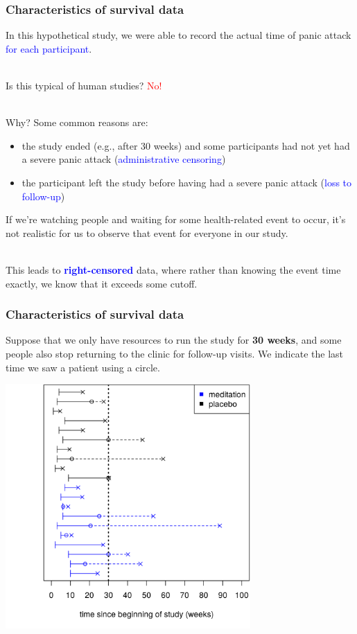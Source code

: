 \documentclass[10pt,t]{beamer}
\begin{document}
\begin{frame}
\frametitle{Characteristics of survival data}

\vspace{-5 mm}

In this hypothetical study, we were able to record the actual time of panic attack \textcolor{blue}{for each participant}.
\\ ~\ 

Is this typical of human studies?   \textcolor{red}{No!}
\\ ~\ 

Why?   Some common reasons are:
\medskip

\begin{itemize}
\item the study ended (e.g., after 30 weeks) and some participants had not yet had a severe panic attack (\textcolor{blue}{administrative censoring})

\smallskip

\item the participant left the study before having had a severe panic attack (\textcolor{blue}{loss to follow-up})
\end{itemize}
\medskip

If we're watching people and waiting for some health-related event to occur, it's not realistic for us to observe that event for everyone in our study. 
\\ ~\ 

This leads to \textcolor{blue}{\textbf{right-censored}} data, where rather than knowing the event time exactly, we know that it exceeds some cutoff.
\end{frame}

\begin{frame}
\frametitle{Characteristics of survival data}
\vspace{-0.8cm}
Suppose that we only have resources to run the study for \textbf{30 weeks}, and some people also stop returning to the clinic for follow-up visits. We indicate the last time we saw a patient using a circle.  
\begin{center}
\includegraphics[width=0.7\textwidth]{figs/meditation_censored_study_time.png}
\end{center}
\end{frame}
\end{document}

